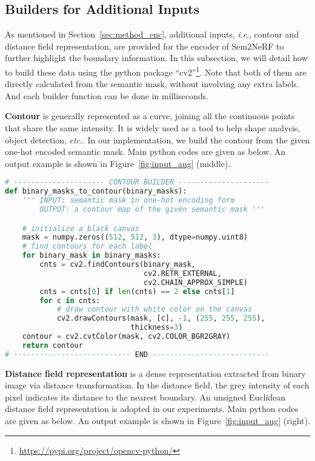 \documentclass[runningheads]{llncs}
\newcommand{\ie}{\textit{i}.\textit{e}.}
\newcommand{\etc}{\textit{etc}.}
\begin{document}
\subsection{Builders for Additional Inputs} \label{sec:tech_input}

As mentioned in Section~\ref{sec:method_enc}, additional inputs, \ie, contour and distance field representation, are provided for the encoder of Sem2NeRF to further highlight the boundary information. In this subsection, we will detail how to build these data using the python package ``cv2''\footnote{\url{https://pypi.org/project/opencv-python/}}. Note that both of them are directly calculated from the semantic mask, without involving any extra labels. And each builder function can be done in  milliseconds.

\textbf{Contour} is generally represented as a curve, joining all the continuous points that share the same intensity. It is widely used as a tool to help shape analysis, object detection, \etc. In our implementation, we build the contour from the given one-hot encoded semantic mask. Main python codes are given as below. An output example is shown in Figure~\ref{fig:input_aug} (middle).

\begin{lstlisting}[language=Python]
# --------------------- CONTOUR BUILDER ---------------------
def binary_masks_to_contour(binary_masks):
    ''' INPUT: semantic mask in one-hot encoding form
        OUTPUT: a contour map of the given semantic mask '''

    # initialize a black canvas
    mask = numpy.zeros((512, 512, 3), dtype=numpy.uint8)
    # find contours for each label 
    for binary_mask in binary_masks:
        cnts = cv2.findContours(binary_mask, 
                                cv2.RETR_EXTERNAL, 
                                cv2.CHAIN_APPROX_SIMPLE)
        cnts = cnts[0] if len(cnts) == 2 else cnts[1]
        for c in cnts:
            # draw contour with white color on the canvas
            cv2.drawContours(mask, [c], -1, (255, 255, 255), 
                             thickness=3)
    contour = cv2.cvtColor(mask, cv2.COLOR_BGR2GRAY)
    return contour
# --------------------------- END ---------------------------
\end{lstlisting}


\textbf{Distance field representation} is a dense representation extracted from binary image via distance transformation. In the distance field, the grey intensity of each pixel indicates its distance to the nearest boundary. An unsigned Euclidean distance field representation is adopted in our experiments. Main python codes are given as below. An output example is shown in Figure~\ref{fig:input_aug} (right).
\end{document}

